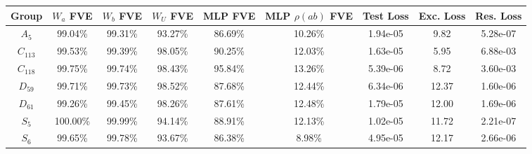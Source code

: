 \begin{tabular}{ccccccccc}
\toprule
    Group & $W_a$ FVE & $W_b$ FVE & $W_U$ FVE & MLP FVE & MLP $\rho(ab)$ FVE & Test Loss & Exc. Loss & Res. Loss \\
\midrule
  $A_{5}$ &   99.04\% &   99.31\% &   93.27\% & 86.69\% &            10.26\% &  1.94e-05 &      9.82 &  5.28e-07 \\
$C_{113}$ &   99.53\% &   99.39\% &   98.05\% & 90.25\% &            12.03\% &  1.63e-05 &      5.95 &  6.88e-03 \\
$C_{118}$ &   99.75\% &   99.74\% &   98.43\% & 95.84\% &            13.26\% &  5.39e-06 &      8.72 &  3.60e-03 \\
 $D_{59}$ &   99.71\% &   99.73\% &   98.52\% & 87.68\% &            12.44\% &  6.34e-06 &     12.37 &  1.60e-06 \\
 $D_{61}$ &   99.26\% &   99.45\% &   98.26\% & 87.61\% &            12.48\% &  1.79e-05 &     12.00 &  1.69e-06 \\
  $S_{5}$ &  100.00\% &   99.99\% &   94.14\% & 88.91\% &            12.13\% &  1.02e-05 &     11.72 &  2.21e-07 \\
  $S_{6}$ &   99.65\% &   99.78\% &   93.67\% & 86.38\% &             8.98\% &  4.95e-05 &     12.17 &  2.66e-06 \\
\bottomrule
\end{tabular}
